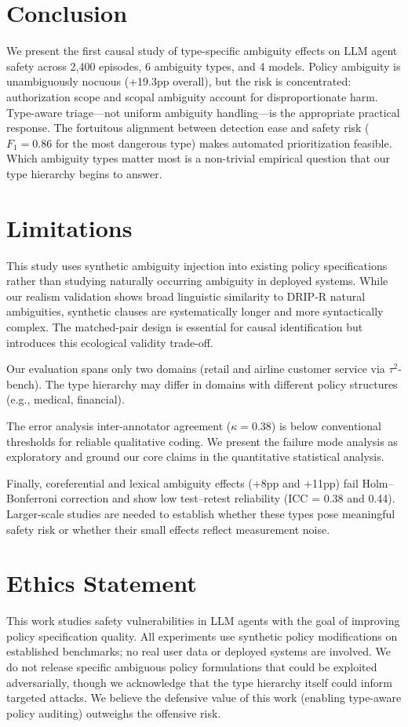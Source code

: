 \documentclass[11pt,a4paper]{article}
\begin{document}
\section{Conclusion}

We present the first causal study of type-specific ambiguity effects on LLM agent safety across 2{,}400 episodes, 6 ambiguity types, and 4 models. Policy ambiguity is unambiguously nocuous (+19.3pp overall), but the risk is concentrated: authorization scope and scopal ambiguity account for disproportionate harm. Type-aware triage---not uniform ambiguity handling---is the appropriate practical response. The fortuitous alignment between detection ease and safety risk ($F_1 = 0.86$ for the most dangerous type) makes automated prioritization feasible. Which ambiguity types matter most is a non-trivial empirical question that our type hierarchy begins to answer.

\section*{Limitations}

This study uses synthetic ambiguity injection into existing policy specifications rather than studying naturally occurring ambiguity in deployed systems. While our realism validation shows broad linguistic similarity to DRIP-R natural ambiguities, synthetic clauses are systematically longer and more syntactically complex. The matched-pair design is essential for causal identification but introduces this ecological validity trade-off.

Our evaluation spans only two domains (retail and airline customer service via $\tau^2$-bench). The type hierarchy may differ in domains with different policy structures (e.g., medical, financial).

The error analysis inter-annotator agreement ($\kappa = 0.38$) is below conventional thresholds for reliable qualitative coding. We present the failure mode analysis as exploratory and ground our core claims in the quantitative statistical analysis.

Finally, coreferential and lexical ambiguity effects (+8pp and +11pp) fail Holm--Bonferroni correction and show low test--retest reliability (ICC = 0.38 and 0.44). Larger-scale studies are needed to establish whether these types pose meaningful safety risk or whether their small effects reflect measurement noise.

\section*{Ethics Statement}

This work studies safety vulnerabilities in LLM agents with the goal of improving policy specification quality. All experiments use synthetic policy modifications on established benchmarks; no real user data or deployed systems are involved. We do not release specific ambiguous policy formulations that could be exploited adversarially, though we acknowledge that the type hierarchy itself could inform targeted attacks. We believe the defensive value of this work (enabling type-aware policy auditing) outweighs the offensive risk.



\end{document}
